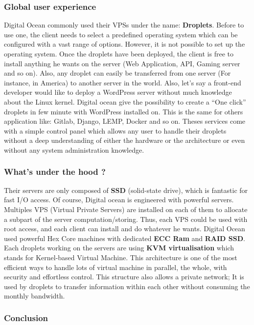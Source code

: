 \subsubsection{Global user experience}

Digital Ocean commonly used their VPSs under the name: \textbf{Droplets}. Before to use one, the client needs to select a predefined operating system which can be configured with a vast range of options. However, it is not possible to set up the operating system. Once the droplets have been deployed, the client is free to install anything he wants on the server (Web Application, API, Gaming server and so on). Also, any droplet can easily be transferred from one server (For instance, in America) to another server in the world. Also, let’s say a front-end developer would like to deploy a WordPress server without much knowledge about the Linux kernel. Digital ocean give the possibility to create a “One click” droplets in few minute with WordPress installed on. This is the same for others application like: Gitlab, Django, LEMP, Docker and so on. Theses services come with a simple control panel which allows any user to handle their droplets without a deep understanding of either the hardware or the architecture or even without any system administration knowledge.

\subsubsection{What’s under the hood ?}

Their servers are only composed of \textbf{SSD} (solid-state drive), which is fantastic for fast I/O access. Of course, Digital ocean is engineered with powerful servers. Multiples VPS (Virtual Private Servers) are installed on each of them to allocate a subpart of the server computation/storing. Thus, each VPS could be used with root access, and each client can install and do whatever he wants.  Digital Ocean used powerful Hex Core machines with dedicated \textbf{ECC Ram} and \textbf{RAID SSD}. Each droplets working on the servers are using \textbf{KVM virtualisation} which stands for Kernel-based Virtual Machine. This architecture is one of the most efficient ways to handle lots of virtual machine in parallel, the whole, with security and effortless control. This structure also allows a private network; It is used by droplets to transfer information within each other without consuming the monthly bandwidth.

\subsubsection{Conclusion}

